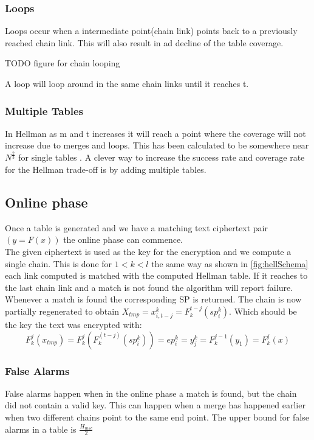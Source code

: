 \subsubsection{Loops}
Loops occur when a intermediate point(chain link) points back to a previously reached chain link. This will also result in ad decline of the table coverage.

TODO figure for chain looping

A loop will loop around in the same chain links until it reaches t.

\subsubsection{Multiple Tables}
In Hellman as m and t increases it will reach a point where the coverage will not increase due to merges and loops. This has been calculated to be somewhere near $N^{\frac{2}{3}}$ for single tables \cite{176}. A clever way to increase the success rate and coverage rate for the Hellman trade-off is by adding multiple tables.

\subsection{Online phase}
Once a table is generated and we have a matching text ciphertext pair $(y=F(x))$ the online phase can commence.\\
The given ciphertext is used as the key for the encryption and we compute a single chain. This is done for $1<k<l$ the same way as shown in \ref{fig:hellSchema} each link computed is matched with the computed Hellman table. If it reaches to the last chain link and a match is not found the algorithm will report failure.\\

Whenever a match is found the corresponding SP is returned. The chain is now partially regenerated to obtain $X_{tmp}=x^k_{i,t-j}=F^{t-j}_k(sp^k_i)$. Which should be the key the text was encrypted with:
\begin{equation}
    F^j_k(x_{tmp})=F^j_k(F^(t-j)_k(sp^k_i))=ep^k_i=y^k_j=F^{j-1}_k(y_1)=F^j_k(x)
\end{equation}
\subsubsection{False Alarms}
False alarms happen when in the online phase a match is found, but the
chain did not contain a valid key. This can happen when a merge has
happened earlier when two different chains point to the same end
point. The upper bound for false alarms in a table is $\frac{H_{msc}}{2}$

